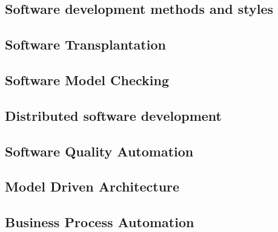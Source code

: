 \subsection{Software development methods and styles}
\label{c:literatur:summaries:soft-dev-methods}


\subsection{Software Transplantation}
\label{c:literatur:summaries:soft-trans}


\subsection{Software Model Checking}
\label{c:literatur:summaries:model-checking}


\subsection{Distributed software development}
\label{c:literatur:summaries:dist-soft-dev}


\subsection{Software Quality Automation}
\label{c:literatur:summaries:quality-auto}


\subsection{Model Driven Architecture}
\label{c:literatur:summaries:model-driven-arch}


\subsection{Business Process Automation}
\label{c:literatur:summaries:busi-process-auto}
